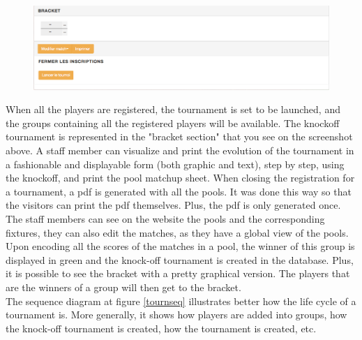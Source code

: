 \documentclass[a4paper, 12pt]{article}
\begin{document}
\begin{figure}[h]
\includegraphics[scale=0.5]{bracket.png}
\end{figure}
\FloatBarrier
When all the players are registered, the tournament is set to be launched, and the groups containing all the registered players will be available. The knockoff tournament is represented in the "bracket section" that you see on the screenshot above. A staff member can visualize and print the evolution of the tournament in a fashionable and displayable form (both graphic and text), step by step, using the knockoff, and print the pool matchup sheet. When closing the registration for a tournament, a pdf is generated with all the pools. It was done this way so that the visitors can print the pdf themselves. Plus, the pdf is only generated once. The staff members can see on the website the pools and the corresponding fixtures, they can also edit the matches, as they have a global view of the pools. \\

Upon encoding all the scores of the matches in a pool, the winner of this group is displayed in green and the knock-off tournament is created in the database. Plus, it is  possible to see the bracket with a pretty graphical version. The players that are the winners of a group will then get to the bracket.\\

The sequence diagram at figure \ref{tournseq} illustrates better how the life cycle of a tournament is. More generally, it shows how players are added into groups, how the knock-off tournament is created, how the tournament is created, etc.\\
\end{document}
